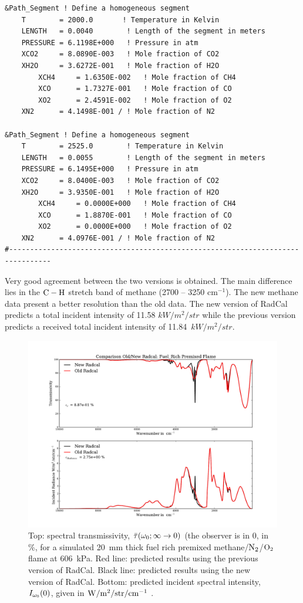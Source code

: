 \begin{lstlisting}
&Path_Segment ! Define a homogeneous segment
	T        = 2000.0       ! Temperature in Kelvin
	LENGTH   = 0.0040        ! Length of the segment in meters
	PRESSURE = 6.1198E+000   ! Pressure in atm
	XCO2     = 8.0890E-003   ! Mole fraction of CO2
	XH2O     = 3.6272E-001   ! Mole fraction of H2O
        XCH4     = 1.6350E-002   ! Mole fraction of CH4
        XCO      = 1.7327E-001   ! Mole fraction of CO
        XO2      = 2.4591E-002   ! Mole fraction of O2
	XN2      = 4.1498E-001 / ! Mole fraction of N2

&Path_Segment ! Define a homogeneous segment
	T        = 2525.0        ! Temperature in Kelvin
	LENGTH   = 0.0055        ! Length of the segment in meters
	PRESSURE = 6.1495E+000   ! Pressure in atm
	XCO2     = 8.0400E-003   ! Mole fraction of CO2
	XH2O     = 3.9350E-001   ! Mole fraction of H2O
        XCH4     = 0.0000E+000   ! Mole fraction of CH4
        XCO      = 1.8870E-001   ! Mole fraction of CO
        XO2      = 0.0000E+000   ! Mole fraction of O2
	XN2      = 4.0976E-001 / ! Mole fraction of N2
#--------------------------------------------------------------------------------
\end{lstlisting}
Very good agreement between the two versions is obtained. The main difference lies in the $\rm C-H$ stretch band of methane (2700 -- 3250 cm$^{-1}$). The new methane data present a better resolution than the old data. The new version of RadCal predicts a total incident intensity of 11.58 $kW/m^2/str$ while the previous version predicts a received total incident intensity of 11.84~$kW/m^2/str$.


\begin{figure}
\includegraphics[width=\textwidth]{Figures/Comp_old_new_Premixed_Flame_newCH4.pdf}
\caption{Top: spectral transmissivity, $\bar{\tau}(\omega_0; \infty \rightarrow 0)$ (the observer is in $0$, in \%, for a simulated 20~mm thick fuel rich premixed methane/$\rm N_2$/$\rm O_2$ flame at 606~kPa. Red line: predicted results using the previous version of RadCal. Black line: predicted results using the new version of RadCal. Bottom: predicted incident spectral intensity, $I_{\omega_0}(0)$, given in $\rm W/m^{2}/str/cm^{-1}$ .\label{fig:Test6_Premixed}}
\end{figure}


